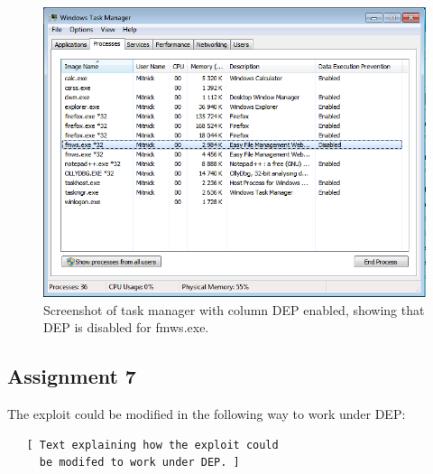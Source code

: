 \documentclass[10pt]{article}
\begin{document}
 \begin{figure}
	\caption{Screenshot of task manager with column DEP enabled, showing that DEP is disabled for fmws.exe.}\vspace{0.2em}
	\label{DEP}
	\includegraphics[width=\textwidth]{DEPdisabled-fmws.png}
\end{figure}


    \subsection{Assignment 7}

      The exploit could be modified in the following way to work under DEP:

      \begin{verbatim}
   [ Text explaining how the exploit could
     be modifed to work under DEP. ]
      \end{verbatim}
\end{document}
